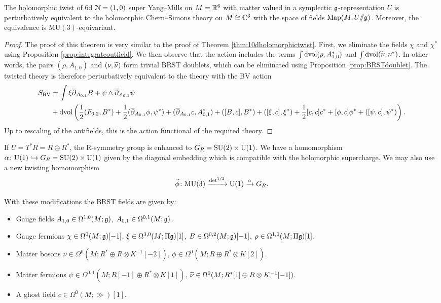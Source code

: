 \documentclass[10pt, oneside]{article}
\newcommand{\MU}{\mathrm{MU}}
\renewcommand{\U}{\mathrm{U}}
\newcommand{\ham}{/\!\!/}
\begin{document}
\begin{theorem}
The holomorphic twist of 6d $\mathcal N=(1, 0)$ super Yang--Mills on $M=\mathbb R^6$ with matter valued in a symplectic $\mathfrak g$-representation $U$ is perturbatively equivalent to the holomorphic Chern--Simons theory on $M\cong \mathbb C^3$ with the space of fields $\map(M, U\ham \fg)$. Moreover, the equivalence is $\MU(3)$-equivariant.
\label{thm:6dholomorphictwist}
\end{theorem}
\begin{proof}
The proof of this theorem is very similar to the proof of Theorem \ref{thm:10dholomorphictwist}. First, we eliminate the fields $\chi$ and $\chi^*$ using Proposition \ref{prop:integrateoutfield}.  We then observe that the action includes the terms $\int \operatorname{dvol}  (\rho, A_{1,0}^*)$ and $\int \operatorname{dvol} (\widetilde{\nu}, \nu^*)$.  In other words, the pairs $(\rho, A_{1,0})$ and $(\nu, \widetilde{\nu})$ form trivial BRST doublets, which can be eliminated using Proposition \ref{prop:BRSTdoublet}. The twisted theory is therefore perturbatively equivalent to the theory with the BV action 
\begin{align*}
 S_{\mathrm{BV}} &= \int \xi \overline{\partial}_{A_{0,1}} B  + \psi \wedge \overline{\partial}_{A_{0,1}} \psi \\
 &+ \operatorname{dvol}\left(\frac 12 (F_{0,2}, B^*) + \frac 12 (\overline{\partial}_{A_{0,1}} \phi, \psi^*) +  (\overline{\partial}_{A_{0, 1}} c, A_{0, 1}^*) + ([B, c], B^*) + ([\xi, c], \xi^*) + \frac{1}{2}[c, c]c^* +  [\phi, c] \phi^* + ([\psi, c],\psi^*)\right).
\end{align*}
Up to rescaling of the antifields, this is the action functional of the required theory.
\end{proof}

If $U=T^*R=R\oplus R^*$, the R-symmetry group is enhanced to $G_R=\SU(2)\times \U(1)$. We have a homomorphism $\alpha\colon \U(1)\hookrightarrow G_R=\SU(2)\times \U(1)$ given by the diagonal embedding which is compatible with the holomorphic supercharge. We may also use a new twisting homomorphism
\[\Tilde{\phi}\colon\MU(3)\xrightarrow{\det^{1/2}}\U(1)\xrightarrow{\alpha} G_R.\]

With these modifications the BRST fields are given by:
\begin{itemize}
\item Gauge fields $A_{1, 0} \in \Omega^{1, 0}(M; \mathfrak g)$, $A_{0, 1}\in\Omega^{0, 1}(M; \mathfrak g)$.
\item Gauge fermions $\chi\in\Omega^0(M; \mathfrak g)[-1]$, $\xi\in\Omega^{3, 0}(M; \Pi\mathfrak g)[1]$, $B\in\Omega^{0, 2}(M; \mathfrak g)[-1]$, $\rho\in\Omega^{1, 0}(M; \Pi\mathfrak g)[1]$.
\item Matter bosons $\nu\in\Omega^0(M; R^*\oplus R\otimes K^{-1}[-2])$, $\phi\in\Omega^0(M; R\oplus R^*\otimes K[2])$.
\item Matter fermions $\psi\in \Omega^{0, 1}(M; R[-1]\oplus R^*\otimes K[1])$, $\widetilde{\nu}\in\Omega^0(M; R^*[1]\oplus R\otimes K^{-1}[-1])$.
\item A ghost field $c\in \Omega^0(M; \gg)[1]$.
\end{itemize}
\end{document}
